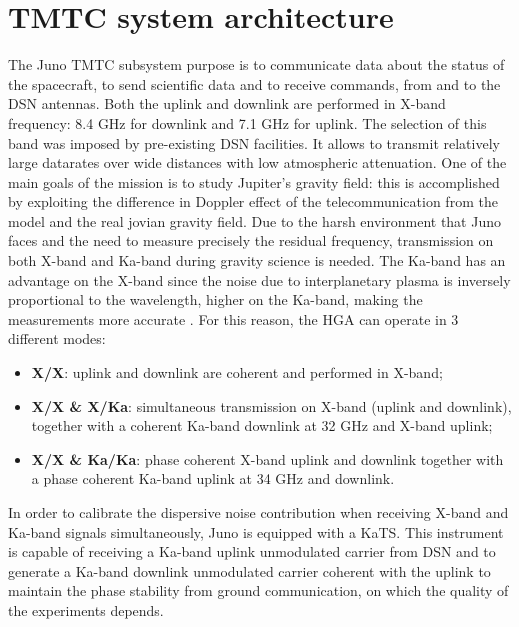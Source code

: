 \section{TMTC system architecture}
\label{sec:TMTC_architecture}


The Juno TMTC subsystem purpose is to communicate data about the status of the spacecraft, to send scientific data and to receive commands, from and to the DSN antennas. Both the uplink and downlink are performed in X-band frequency: 8.4 GHz for downlink and 7.1 GHz for uplink. The selection of this band was imposed by pre-existing DSN facilities. It allows to transmit relatively large datarates over wide distances with low atmospheric attenuation.
One of the main goals of the mission is to study Jupiter's gravity field: this is accomplished by exploiting the difference in Doppler effect of the telecommunication from the model and the real jovian gravity field. Due to the harsh environment that Juno faces and the need to measure precisely the residual frequency, transmission on both X-band and Ka-band during gravity science is needed. The Ka-band has an advantage on the X-band since the noise due to interplanetary plasma is inversely proportional to the wavelength, higher on the Ka-band, making the measurements more accurate \cite{ka_uplink}. 
For this reason, the HGA can operate in 3 different modes: 

\begin{itemize}
\item \textbf{X/X}: uplink and downlink are coherent and performed in X-band;
\item \textbf{X/X \& X/Ka}: simultaneous transmission on X-band (uplink and downlink), together with a coherent Ka-band downlink at 32 GHz and X-band uplink;
\item \textbf{X/X \& Ka/Ka}: phase coherent X-band uplink and downlink together with a phase coherent Ka-band uplink at 34 GHz and downlink.
\end{itemize}

In order to calibrate the dispersive noise contribution when receiving X-band and Ka-band signals simultaneously, Juno is equipped with a KaTS. This instrument is capable of receiving a Ka-band uplink unmodulated carrier from DSN and to generate a Ka-band downlink unmodulated carrier coherent with the uplink to maintain the phase stability from ground communication, on which the quality of the experiments depends\cite{juno_telecommunication}.

